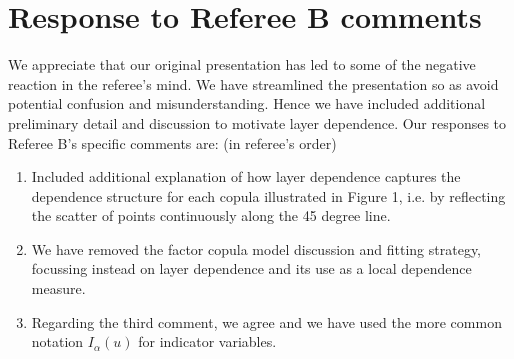\documentclass[a4paper, 12pt]{report}
\begin{document}
\section*{Response to Referee B comments}


We appreciate that our original presentation has led to some of the negative reaction in the referee's  mind.   We have   streamlined the presentation so as avoid potential confusion and misunderstanding. Hence we have included additional  preliminary detail and discussion to motivate layer dependence.
Our responses to Referee B's specific comments are: (in referee's order)


\begin{enumerate}
\item Included additional explanation of how layer dependence captures the dependence structure for each copula illustrated in Figure 1, i.e. by reflecting the scatter of points continuously along the 45 degree line.
\item We have removed the factor copula model discussion and fitting strategy, focussing instead on layer dependence and its use as a local dependence measure.
\item Regarding the third comment, we agree and we have used the more common notation $I_\alpha(u)$ for indicator variables.



\end{enumerate}
\end{document}
